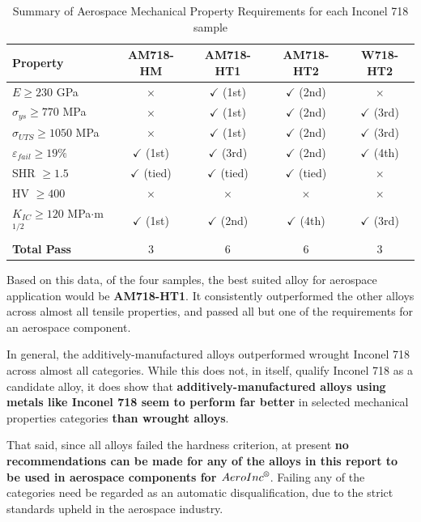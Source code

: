 \documentclass{article}
\begin{document}
\begin{table}[H]
	\centering
	\caption{Summary of Aerospace Mechanical Property Requirements for each Inconel 718 sample}
	\vspace{0.5em}
	\label{tab:passfail}
	\begin{tabular}{lcccc}
		\hline
		\textbf{Property} & \textbf{AM718-HM} & \textbf{AM718-HT1} & \textbf{AM718-HT2} & \textbf{W718-HT2} \\
		\hline
		$E \geq 230$ GPa              & $\times$ & $\checkmark$ (1st) & $\checkmark$ (2nd) & $\times$ \\
		$\sigma_{ys} \geq 770$ MPa    & $\times$ & $\checkmark$ (1st) & $\checkmark$ (2nd) & $\checkmark$ (3rd) \\
		$\sigma_{UTS} \geq 1050$ MPa  & $\times$ & $\checkmark$ (1st) & $\checkmark$ (2nd) & $\checkmark$ (3rd) \\
		$\varepsilon_{fail} \geq 19\%$& $\checkmark$ (1st) & $\checkmark$ (3rd) & $\checkmark$ (2nd) & $\checkmark$ (4th) \\
		SHR $\geq 1.5$                & $\checkmark$ (tied) & $\checkmark$ (tied) & $\checkmark$ (tied) & $\times$ \\
		HV $\geq 400$                 & $\times$ & $\times$ & $\times$ & $\times$ \\
		$K_{IC} \geq 120$ MPa$\cdot$m$^{1/2}$ & $\checkmark$ (1st) & $\checkmark$ (2nd) & $\checkmark$ (4th) & $\checkmark$ (3rd) \\
		\hline
		\textbf{Total Pass}           & 3 & 6 & 6 & 3 \\
		\hline
	\end{tabular}
\end{table}

Based on this data, of the four samples, the best suited alloy for aerospace application would be \textbf{AM718-HT1}. It consistently outperformed the other alloys across almost all tensile properties, and passed all but one of the requirements for an aerospace component. 

In general, the additively-manufactured alloys outperformed wrought Inconel 718 across almost all categories. While this does not, in itself, qualify Inconel 718 as a candidate alloy, it does show that \textbf{additively-manufactured alloys using metals like Inconel 718 seem to perform far better} in selected mechanical properties categories \textbf{than wrought alloys}.

That said, since all alloys failed the hardness criterion, at present \textbf{no recommendations can be made for any of the alloys in this report to be used in aerospace components for $AeroInc^{\text{\textregistered}}$}. Failing any of the categories need be regarded as an automatic disqualification, due to the strict standards upheld in the aerospace industry.
\end{document}

